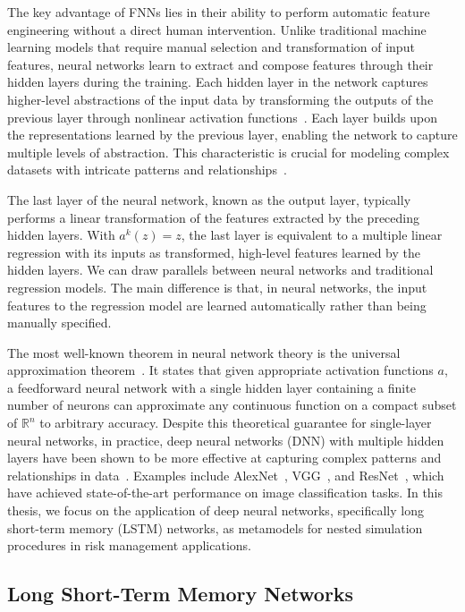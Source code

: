 The key advantage of FNNs lies in their ability to perform automatic feature engineering without a direct human intervention. 
Unlike traditional machine learning models that require manual selection and transformation of input features, neural networks learn to extract and compose features through their hidden layers during the training. 
Each hidden layer in the network captures higher-level abstractions of the input data by transforming the outputs of the previous layer through nonlinear activation functions~\citep{lecun2015deep}.
Each layer builds upon the representations learned by the previous layer, enabling the network to capture multiple levels of abstraction. 
This characteristic is crucial for modeling complex datasets with intricate patterns and relationships~\citep{bengio2013representation}.

The last layer of the neural network, known as the output layer, typically performs a linear transformation of the features extracted by the preceding hidden layers. 
With $a^{k}(z) = z$, the last layer is equivalent to a multiple linear regression with its inputs as transformed, high-level features learned by the hidden layers.
We can draw parallels between neural networks and traditional regression models. 
The main difference is that, in neural networks, the input features to the regression model are learned automatically rather than being manually specified.

The most well-known theorem in neural network theory is the universal approximation theorem~\citep{hornik1989multilayer}.
It states that given appropriate activation functions $a$, a feedforward neural network with a single hidden layer containing a finite number of neurons can approximate any continuous function on a compact subset of $\mathbb{R}^n$ to arbitrary accuracy. 
Despite this theoretical guarantee for single-layer neural networks, in practice, deep neural networks (DNN) with multiple hidden layers have been shown to be more effective at capturing complex patterns and relationships in data~\citep{lecun2015deep}.
Examples include AlexNet~\citep{krizhevsky2012imagenet}, VGG~\citep{simonyan2014very}, and ResNet~\citep{he2016deep}, which have achieved state-of-the-art performance on image classification tasks.
In this thesis, we focus on the application of deep neural networks, specifically long short-term memory (LSTM) networks, as metamodels for nested simulation procedures in risk management applications.

\subsection{Long Short-Term Memory Networks} \label{subsec:LSTM}

